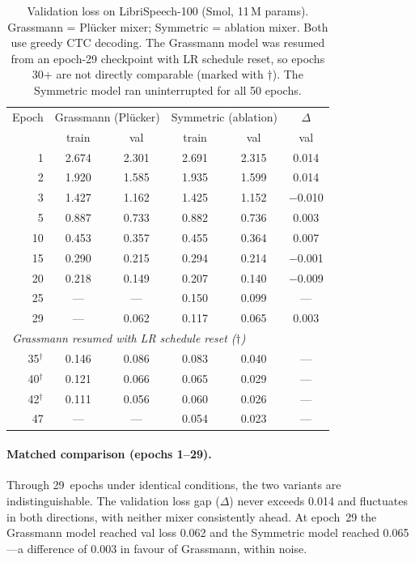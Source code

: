 \documentclass[11pt,a4paper]{article}
\newcommand{\plucker}{Pl\"{u}cker}
\begin{document}
\begin{table}[h]
\centering
\caption{Validation loss on LibriSpeech-100 (Smol, 11\,M params).
Grassmann = \plucker{} mixer; Symmetric = ablation mixer.  Both use
greedy CTC decoding.  The Grassmann model was resumed from an epoch-29
checkpoint with LR schedule reset, so epochs 30+ are not directly
comparable (marked with $\dagger$).  The Symmetric model ran
uninterrupted for all 50 epochs.}
\label{tab:smol_results}
\begin{tabular}{rccccc}
\toprule
Epoch & \multicolumn{2}{c}{Grassmann (\plucker{})} &
        \multicolumn{2}{c}{Symmetric (ablation)} & $\Delta$ \\
      & train & val & train & val & val \\
\midrule
1   & 2.674 & 2.301 & 2.691 & 2.315 & 0.014 \\
2   & 1.920 & 1.585 & 1.935 & 1.599 & 0.014 \\
3   & 1.427 & 1.162 & 1.425 & 1.152 & $-$0.010 \\
5   & 0.887 & 0.733 & 0.882 & 0.736 & 0.003 \\
10  & 0.453 & 0.357 & 0.455 & 0.364 & 0.007 \\
15  & 0.290 & 0.215 & 0.294 & 0.214 & $-$0.001 \\
20  & 0.218 & 0.149 & 0.207 & 0.140 & $-$0.009 \\
25  & ---   & ---   & 0.150 & 0.099 & --- \\
29  & ---   & 0.062 & 0.117 & 0.065 & 0.003 \\
\midrule
\multicolumn{6}{l}{\emph{Grassmann resumed with LR schedule reset ($\dagger$)}} \\
35$^\dagger$ & 0.146 & 0.086 & 0.083 & 0.040 & --- \\
40$^\dagger$ & 0.121 & 0.066 & 0.065 & 0.029 & --- \\
42$^\dagger$ & 0.111 & 0.056 & 0.060 & 0.026 & --- \\
47  & ---   & ---   & 0.054 & 0.023 & --- \\
\bottomrule
\end{tabular}
\end{table}

\paragraph{Matched comparison (epochs 1--29).}
Through 29~epochs under identical conditions, the two variants are
indistinguishable.  The validation loss gap ($\Delta$) never exceeds
0.014 and fluctuates in both directions, with neither mixer
consistently ahead.  At epoch~29 the Grassmann model reached val
loss 0.062 and the Symmetric model reached 0.065---a difference of
0.003 in favour of Grassmann, within noise.
\end{document}
